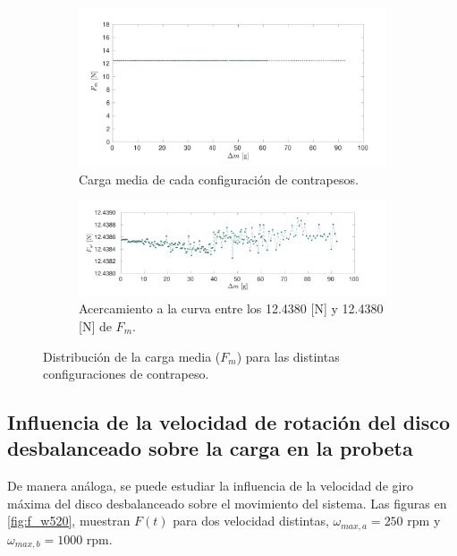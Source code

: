\begin{figure}[H]
\centering
	\begin{subfigure}{1\linewidth}
		\centering
		\includegraphics[width=1\linewidth]{Imagenes/fm_dm.pdf}
		\caption{Carga media de cada configuración de contrapesos.}\label{fig:fm_dm}
	\end{subfigure}
	\begin{subfigure}{1\linewidth}
		\centering
		\includegraphics[width=1\linewidth]{Imagenes/fm_dmsp.pdf}
		\caption{Acercamiento a la curva entre los 12.4380 [N] y 12.4380 [N] de $F_m$. }\label{fig:fm_dmsp}
	\end{subfigure}
\par\bigskip
\caption{Distribución de la carga media ($F_m$) para las distintas configuraciones de contrapeso.}
\label{fig:velt_12}
\end{figure}

\newpage

\subsection{Influencia de la velocidad de rotación del disco desbalanceado sobre la carga en la probeta}

De manera análoga, se puede estudiar la influencia de la velocidad de giro máxima del disco desbalanceado sobre el movimiento del sistema. Las figuras en \ref{fig:f_w520}, muestran $F(t)$ para dos velocidad distintas, $\omega_{max,a} = 250$ rpm y $\omega_{max,b}=1000$ rpm. 

